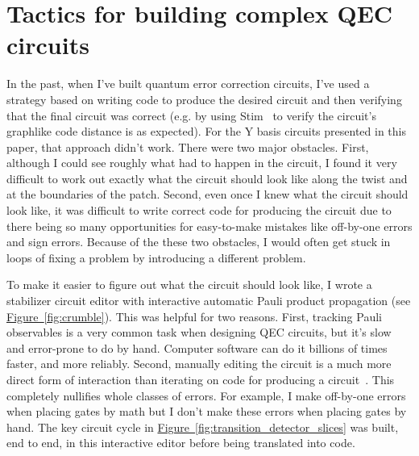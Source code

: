\documentclass[onecolumn,unpublished,a4paper]{quantumarticle}
\theoremstyle{definition}
\theoremstyle{definition}
\theoremstyle{definition}
\newcommand{\fig}[1]{\hyperref[fig:#1]{Figure~\ref*{fig:#1}}}
\begin{document}
\section{Tactics for building complex QEC circuits}
\label{app:the_struggle}

In the past, when I've built quantum error correction circuits, I've used a strategy based on writing code to produce the desired circuit and then verifying that the final circuit was correct (e.g. by using Stim~\cite{gidney2021stim} to verify the circuit's graphlike code distance is as expected).
For the Y basis circuits presented in this paper, that approach didn't work.
There were two major obstacles.
First, although I could see roughly what had to happen in the circuit, I found it very difficult to work out exactly what the circuit should look like along the twist and at the boundaries of the patch.
Second, even once I knew what the circuit should look like, it was difficult to write correct code for producing the circuit due to there being so many opportunities for easy-to-make mistakes like off-by-one errors and sign errors.
Because of the these two obstacles, I would often get stuck in loops of fixing a problem by introducing a different problem.

To make it easier to figure out what the circuit should look like, I wrote a stabilizer circuit editor with interactive automatic Pauli product propagation (see \fig{crumble}).
This was helpful for two reasons.
First, tracking Pauli observables is a very common task when designing QEC circuits, but it's slow and error-prone to do by hand.
Computer software can do it billions of times faster, and more reliably.
Second, manually editing the circuit is a much more direct form of interaction than iterating on code for producing a circuit~\cite{brettvictormediaforthinking2013}.
This completely nullifies whole classes of errors.
For example, I make off-by-one errors when placing gates by math but I don't make these errors when placing gates by hand.
The key circuit cycle in \fig{transition_detector_slices} was built, end to end, in this interactive editor before being translated into code.
\end{document}
